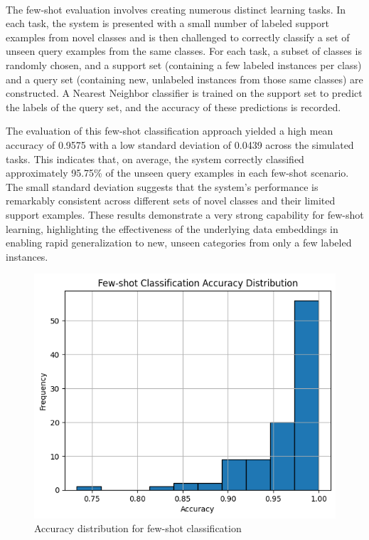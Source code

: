 \documentclass{CUP-JNL-DTM}
\theoremstyle{definition}
\numberwithin{equation}{section}
\begin{document}
 \paragraph{}The few-shot evaluation involves creating numerous distinct learning tasks. In each task, the system is presented with a small number of labeled support examples from novel classes and is then challenged to correctly classify a set of unseen query examples from the same classes. For each task, a subset of classes is randomly chosen, and a support set (containing a few labeled instances per class) and a query set (containing new, unlabeled instances from those same classes) are constructed. A Nearest Neighbor classifier is trained on the support set to predict the labels of the query set, and the accuracy of these predictions is recorded.

The evaluation of this few-shot classification approach yielded a high mean accuracy of 0.9575 with a low standard deviation of 0.0439 across the simulated tasks. This indicates that, on average, the system correctly classified approximately 95.75\% of the unseen query examples in each few-shot scenario. The small standard deviation suggests that the system's performance is remarkably consistent across different sets of novel classes and their limited support examples. These results demonstrate a very strong capability for few-shot learning, highlighting the effectiveness of the underlying data embeddings in enabling rapid generalization to new, unseen categories from only a few labeled instances.


\begin{figure}[ht]
    \centering
    \includegraphics[width=0.75\linewidth]{rttttttttttt.png}
    \caption{Accuracy distribution for few-shot classification}
    \label{fig:enter-label}
\end{figure}
\end{document}
